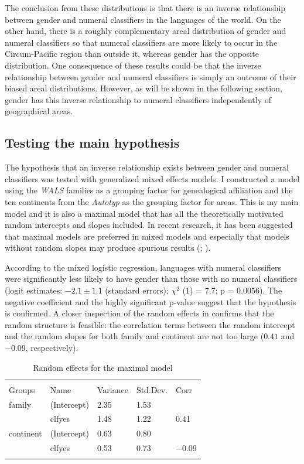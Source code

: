 \documentclass[output=collectionpaper]{langsci/langscibook}
\begin{document}
The conclusion from these distributions is that there is an inverse relationship between gender and numeral classifiers in the languages of the world. On the other hand, there is a roughly complementary areal distribution of gender and numeral classifiers so that numeral classifiers are more likely to occur in the Circum-Pacific region than outside it, whereas gender has the opposite distribution. One consequence of these results could be that the inverse relationship between gender and numeral classifiers is simply an outcome of their biased areal distributions. However, as will be shown in the following section, gender has this inverse relationship to numeral classifiers independently of geographical areas.


\subsection{Testing the main hypothesis}
\label{sec:Sinne:4.2}

The hypothesis that an inverse relationship exists between gender and numeral classifiers was tested with generalized mixed effects models. I constructed a model using the \textit{WALS} families as a grouping factor for genealogical affiliation and the ten continents from the \textit{Autotyp} as the grouping factor for areas. This is my main model and it is also a maximal model that has all the theoretically motivated random intercepts and slopes included. In recent research, it has been suggested that maximal models are preferred in mixed models and especially that models without random slopes may produce spurious results (\citealt{Schielzeth2009}; \citealt{Barr2013}).

According to the mixed logistic regression, languages with numeral classifiers were significantly less likely to have gender than those with no numeral classifiers (logit estimates: $-2.1 \pm 1.1$ (standard errors); $\chi^2$ (1) = 7.7; p = 0.0056). The negative coefficient and the highly significant p-value suggest that the hypothesis is confirmed. A closer inspection of the random effects in  confirms that the random structure is feasible: the correlation terms between the random intercept and the random slopes for both family and continent are not too large ($0.41$ and $-0.09$, respectively).

\begin{table}[htb]
\begin{tabularx}{\textwidth}{XXXXX}
\lsptoprule
\multicolumn{2}{l}{Random effects:} &  & \\
 Groups &  Name &  Variance &  Std.Dev. &  Corr\\
\midrule
family & (Intercept) & 2.35 & 1.53\\
& clfyes & 1.48 & 1.22 & 0.41\\
continent & (Intercept) & 0.63 & 0.80\\
& clfyes & 0.53 & 0.73 & $-0.09$\\
\lspbottomrule
\end{tabularx}
\caption{Random effects for the maximal model}
\label{tab:Sinne:3}
\end{table}
\end{document}
